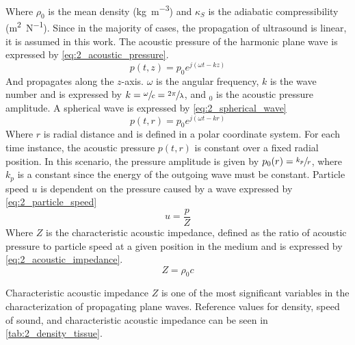 Where $\rho_{0}$ is the mean density (\unit{\kilogram\per\meter\cubed}) and $\kappa_{S}$ is the \gls{adiabatic} compressibility (\unit{\meter\squared\per\newton}). Since in the majority of cases, the propagation of ultrasound is linear, it is assumed in this work. The acoustic pressure of the harmonic plane wave is expressed by \cref{eq:2_acoustic_pressure}. \raggedbottom
\begin{equation} \label{eq:2_acoustic_pressure}
	p(t,z)=p_{0} e^{j(\omega t - k z)}
\end{equation}
And propagates along the $z$-axis. $\omega$ is the angular frequency, $k$ is the wave number and is expressed by $k=\sfrac{\omega}{c}=\sfrac{2\pi}{\lambda}$, and $_{0}$ is the acoustic pressure amplitude. A spherical wave is expressed by \cref{eq:2_spherical_wave}
\begin{equation} \label{eq:2_spherical_wave}
	p(t,r)=p_{0} e^{j(\omega t - k r)}
\end{equation}
Where $r$ is radial distance and is defined in a polar coordinate system. For each time instance, the acoustic pressure $p(t,r)$ is constant over a fixed radial position. In this scenario, the pressure amplitude is given by $p_{0}(r) = \sfrac{k_{p}}{r}$, where $k_{p}$ is a constant since the energy of the outgoing wave must be constant.  Particle speed $u$ is dependent on the pressure caused by a wave expressed by \cref{eq:2_particle_speed}
\begin{equation} \label{eq:2_particle_speed}
	u = \frac{p}{Z}
\end{equation}
Where $Z$ is the characteristic acoustic impedance, defined as the ratio of acoustic pressure to particle speed at a given position in the medium and is expressed by \cref{eq:2_acoustic_impedance}.
\begin{equation} \label{eq:2_acoustic_impedance}
	Z = \rho_{0} c
\end{equation}

Characteristic acoustic impedance $Z$ is one of the most significant variables in the characterization of propagating plane waves. Reference values for density, speed of sound, and characteristic acoustic impedance can be seen in \cref{tab:2_density_tissue}.

